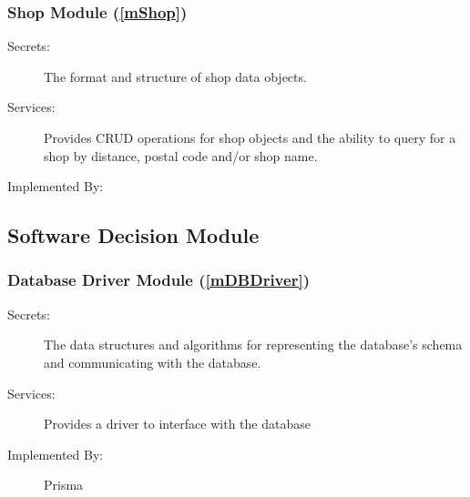 \documentclass[12pt, titlepage]{article}
\begin{document}
\subsubsection{Shop Module (\ref{mShop})}

\begin{description}
	\item[Secrets:] The format and structure of shop data objects.
	\item[Services:] Provides CRUD operations for shop objects and the ability to query for a shop by
		distance, postal code and/or shop name.
	\item[Implemented By:] \progname{}
\end{description}

\subsection{Software Decision Module}


\subsubsection{Database Driver Module (\ref{mDBDriver})}
\begin{description}
	\item[Secrets:] The data structures and algorithms for representing the database's schema and
		communicating with the database.
	\item[Services:] Provides a driver to interface with the database
	\item[Implemented By:] Prisma
\end{description}
\end{document}
